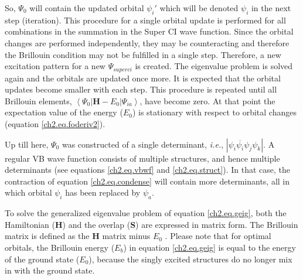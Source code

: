 So, $\Psi_0$ will contain the updated orbital $\psi_i'$ which will be denoted $\psi_i$ in the next step (iteration). This procedure for a single orbital update is performed for all combinations in the summation in the Super CI wave function. Since the orbital changes are performed independently, they may be counteracting and therefore the Brillouin condition may not be fulfilled in a single step. Therefore, a new excitation pattern for a new $\Psi_{superci}$ is created. The eigenvalue problem is solved again and the orbitals are updated once more. It is expected that the orbital updates become smaller with each step. This procedure is repeated until all Brillouin elements, $\left < \Psi_0 | \mathbf{H} - E_0 | \Psi_{ia} \right >$, have become zero. At that point the expectation value of the energy ($E_0$) is stationary with respect to orbital changes (equation \ref{ch2.eq.foderiv2}).

Up till here, $\Psi_0$ was constructed of a single determinant, \textit{i.e.}, $|\psi_i\overline{\psi_i}\psi_j\psi_k|$. A regular VB wave function consists of multiple structures, and hence multiple determinants (see equations \ref{ch2.eq.vbwf} and \ref{ch2.eq.struct}). In that case, the contraction of equation \ref{ch2.eq.condense} will contain more determinants, all in which orbital $\psi_i$ has been replaced by $\psi_a$.

To solve the generalized eigenvalue problem of equation \ref{ch2.eq.geig}, both the Hamiltonian ($\mathbf{H}$) and the overlap ($\mathbf{S}$) are expressed in matrix form.  The Brillouin matrix is defined as the $\mathbf{H}$ matrix minus $E_0$ \cite{koos1}. Please note that for optimal orbitals, the Brillouin energy ($E_b$) in equation \ref{ch2.eq.geig} is equal to the energy of the ground state ($E_0$), because the singly excited structures do no longer mix in with the ground state. 


